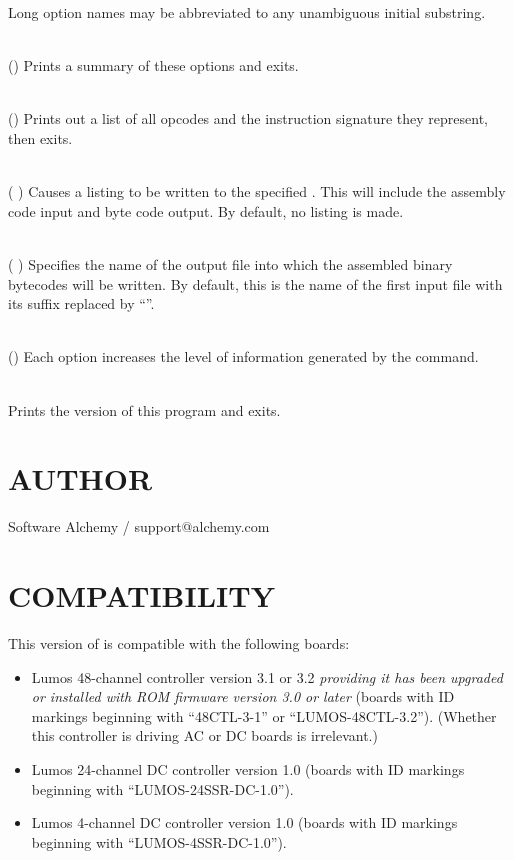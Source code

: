 Long option names may be abbreviated to any unambiguous initial substring.
\begin{list}{}{}
\item[{\codetype{----help}}]\hfill\\
()
Prints a summary of these options and exits.
\item[{\codetype{----list--opcodes}}]\hfill\\
()
Prints out a list of all opcodes and the instruction signature they
represent, then exits.
\item[{\codetype{----listing=}\Var*{file}}]\hfill\\
(
)
Causes a listing to be written to the specified 
.
This will include the assembly code input and byte code output.
By default, no listing is made.
\item[{\codetype{----output=}\Var*{file}}]\hfill\\
(
)
Specifies the name of the output file into which the assembled
binary bytecodes will be written.  By default, this is the name of
the first input file with its suffix replaced by 
``''.
\item[{\codetype{----verbose}}]\hfill\\
()
Each 
option increases the level of information generated by the
command.
\item[{\codetype{----version}}]\hfill\\
Prints the version of this program and exits.
\end{list}
\section*{AUTHOR}


Software Alchemy / support@alchemy.com
\section*{COMPATIBILITY}


This version of 
is compatible with the following boards:
\begin{itemize}
\item
Lumos 48-channel controller version 3.1 or 3.2
\emph{providing it has been upgraded or installed with ROM firmware version 3.0 or later}
(boards with ID markings beginning with ``48CTL-3-1'' or ``LUMOS-48CTL-3.2'').  (Whether this controller is
driving AC or DC boards is irrelevant.)
\item
Lumos 24-channel DC controller version 1.0 (boards with ID markings beginning with
``LUMOS-24SSR-DC-1.0'').
\item
Lumos 4-channel DC controller version 1.0 (boards with ID markings beginning with
``LUMOS-4SSR-DC-1.0'').
\end{itemize}
